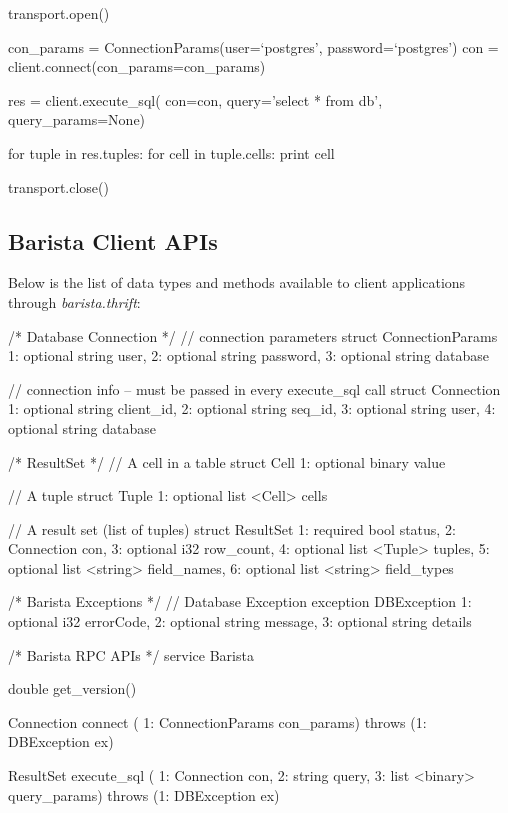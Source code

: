 \documentclass[a4paper]{article}
\begin{document}
\begin{multicols}{2}
{{\begin{spverbatim}
transport.open()

con_params = ConnectionParams(user=`postgres', password=`postgres')
con = client.connect(con_params=con_params)

res  = client.execute_sql(
  con=con,
  query='select * from db',
  query_params=None)

for tuple in res.tuples:
  for cell in tuple.cells:
    print cell

transport.close()
\end{spverbatim}
}
}
\subsection{Barista Client APIs}
Below is the list of data types and methods available to client applications through \emph{barista.thrift}:
\tiny{
\begin{spverbatim}
/* Database Connection */
// connection parameters
struct ConnectionParams {
  1: optional string user,
  2: optional string password,
  3: optional string database
}

// connection info -- must be passed in every execute_sql call
struct Connection {
  1: optional string client_id,
  2: optional string seq_id,
  3: optional string user,
  4: optional string database
}


/* ResultSet */
// A cell in a table
struct Cell {
  1: optional binary value
}

// A tuple
struct Tuple {
  1: optional list <Cell> cells
}

// A result set (list of tuples)
struct ResultSet {
  1: required bool status,
  2: Connection con,
  3: optional i32 row_count,
  4: optional list <Tuple> tuples,
  5: optional list <string> field_names,
  6: optional list <string> field_types
}


/* Barista Exceptions */
// Database Exception
exception DBException {
  1: optional i32 errorCode,
  2: optional string message,
  3: optional string details
}


/* Barista RPC APIs */
service Barista {
  double get_version()

  Connection connect (
     1: ConnectionParams con_params) throws (1: DBException ex)

  ResultSet execute_sql (
     1: Connection con,
     2: string query,
     3: list <binary> query_params) throws (1: DBException ex)
}
\end{spverbatim}
}
\end{multicols}
\end{document}
